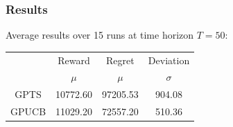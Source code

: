 
\begin{frame}

\frametitle{Results}

Average results over 15 runs at time horizon $T = 50$:

\begin{table}
	\begin{tabular}{|c|cc|c|}
	\hline \hline
		\cellcolor{blue!25} & Reward 	& Regret	& Deviation \\
	\cline{2-4}
		\cellcolor{blue!25} & $\mu$		& $\mu$		& $\sigma$	\\
	\hline \hline
		GPTS 				& 10772.60	& 97205.53	& 904.08	\\
	\hline
		GPUCB				& 11029.20	& 72557.20	& 510.36	\\
	\hline \hline
	\end{tabular}
\end{table}

\end{frame}

